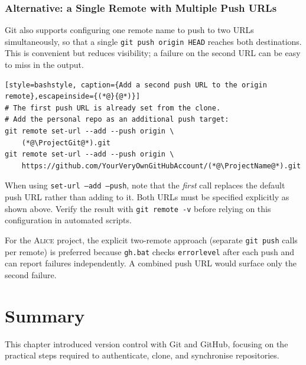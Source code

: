 \subsubsection{Alternative: a Single Remote with Multiple Push URLs}

Git also supports configuring one remote name to push to two URLs
simultaneously, so that a single \texttt{git push origin HEAD} reaches
both destinations. This is convenient but reduces visibility; a failure
on the second URL can be easy to miss in the output.

\begin{lstlisting}[style=bashstyle, caption={Add a second push URL to the origin remote},escapeinside={(*@}{@*)}]
# The first push URL is already set from the clone.
# Add the personal repo as an additional push target:
git remote set-url --add --push origin \
    (*@\ProjectGit@*).git
git remote set-url --add --push origin \
    https://github.com/YourVeryOwnGitHubAccount/(*@\ProjectName@*).git
\end{lstlisting}

\begin{warningbox}
When using \texttt{set-url --add --push}, note that the \emph{first}
call replaces the default push URL rather than adding to it. Both URLs
must be specified explicitly as shown above. Verify the result with
\texttt{git remote -v} before relying on this configuration in
automated scripts.
\end{warningbox}

For the \textsc{Alice} project, the explicit two-remote approach
(separate \texttt{git push} calls per remote) is preferred because
\texttt{gh.bat} checks \texttt{errorlevel} after each push and can
report failures independently. A combined push URL would surface only
the second failure.

\section{Summary}
\label{sec:git-summary}

This chapter introduced version control with Git and GitHub, focusing on
the practical steps required to authenticate, clone, and synchronise
repositories.

